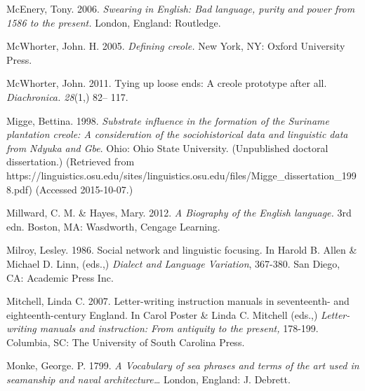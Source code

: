 \begin{styleStandard}
McEnery, Tony. 2006. \textit{Swearing in English: Bad language, purity and power from 1586 to the present. }London, England: Routledge. 
\end{styleStandard}

\begin{styleStandard}
McWhorter, John. H. 2005. \textit{Defining creole. }New York, NY: Oxford University Press.
\end{styleStandard}

\begin{styleStandard}
McWhorter, John. 2011. Tying up loose ends: A creole prototype after all. \textit{Diachronica. 28}(1,) 82– 117. 
\end{styleStandard}

\begin{styleStandard}
Migge, Bettina. 1998. \textit{Substrate influence in the formation of the Suriname plantation creole: A consideration of the sociohistorical data and linguistic data from Ndyuka and Gbe}. Ohio: Ohio State University. (Unpublished doctoral dissertation.) (Retrieved from https://linguistics.osu.edu/sites/linguistics.osu.edu/files/Migge\_dissertation\_1998.pdf) (Accessed 2015-10-07.)
\end{styleStandard}

\begin{styleStandard}
Millward, C. M. \& Hayes, Mary. 2012. \textit{A Biography of the English language.} 3rd edn. Boston, MA: Wasdworth, Cengage Learning. 
\end{styleStandard}

\begin{styleStandard}
Milroy, Lesley. 1986. Social network and linguistic focusing. In Harold B. Allen \& Michael D. Linn, (eds.,) \textit{Dialect and Language Variation}, 367-380. San Diego, CA: Academic Press Inc. 
\end{styleStandard}

\begin{styleStandard}
Mitchell, Linda C. 2007. Letter-writing instruction manuals in seventeenth- and eighteenth-century England. In Carol Poster \& Linda C. Mitchell (eds.,) \textit{Letter-writing manuals and instruction: From antiquity to the present, }178-199. Columbia, SC: The University of South Carolina Press. 
\end{styleStandard}

\begin{styleStandard}
Monke, George. P. 1799. \textit{A Vocabulary of sea phrases and terms of the art used in seamanship and naval architecture… }London, England: J. Debrett.
\end{styleStandard}

